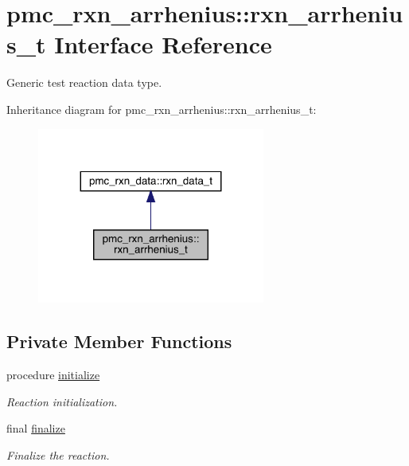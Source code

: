 \hypertarget{structpmc__rxn__arrhenius_1_1rxn__arrhenius__t}{}\section{pmc\+\_\+rxn\+\_\+arrhenius\+:\+:rxn\+\_\+arrhenius\+\_\+t Interface Reference}
\label{structpmc__rxn__arrhenius_1_1rxn__arrhenius__t}


Generic test reaction data type.  




Inheritance diagram for pmc\+\_\+rxn\+\_\+arrhenius\+:\+:rxn\+\_\+arrhenius\+\_\+t\+:\nopagebreak
\begin{figure}[H]
\begin{center}
\leavevmode
\includegraphics[width=212pt]{structpmc__rxn__arrhenius_1_1rxn__arrhenius__t__inherit__graph}
\end{center}
\end{figure}
\subsection*{Private Member Functions}
\begin{DoxyCompactItemize}
\item 
procedure \mbox{\hyperlink{structpmc__rxn__arrhenius_1_1rxn__arrhenius__t_abce47eb559286486d5d5dd30ffdd9110}{initialize}}
\begin{DoxyCompactList}\small\item\em Reaction initialization. \end{DoxyCompactList}\item 
final \mbox{\hyperlink{structpmc__rxn__arrhenius_1_1rxn__arrhenius__t_aee7e606a387c98984267065dee5991d9}{finalize}}
\begin{DoxyCompactList}\small\item\em Finalize the reaction. \end{DoxyCompactList}\end{DoxyCompactItemize}
